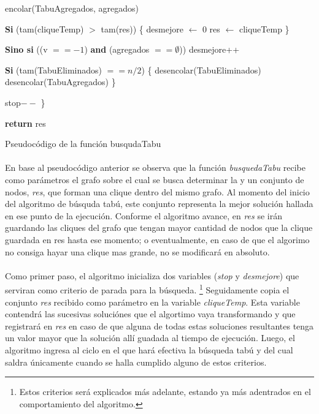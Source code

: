 \begin{algorithm}[H]
	\BlankLine \BlankLine		
	\tab encolar(TabuAgregados, agregados)												
	
	\BlankLine \BlankLine
	\tab \textbf{Si} (tam(cliqueTemp) $>$ tam(res)) \{ 									
	\tab \tab desmejore $\leftarrow$ 0													
	\tab \tab res $\leftarrow$ cliqueTemp												
	\tab \}

	\BlankLine \BlankLine		
	\tab \textbf{Sino si} ((v $== -1$) \textbf{and} (agregados $== \emptyset$)) 	
	\tab \tab desmejore++																
	
	\BlankLine \BlankLine
	\tab \textbf{Si} (tam(TabuEliminados) $== n/2$) \{									
	\tab \tab desencolar(TabuEliminados)												
	\tab \tab desencolar(TabuAgregados)												
	\tab \}	

	\BlankLine \BlankLine
	\tab stop$--$ 																			
	\}
	
	\BlankLine \BlankLine		
	\textbf{return} res																	
\caption{Pseudocódigo de la función busqudaTabu} 
\normalsize
\end{algorithm}

\paragraph{}
En base al pseudocódigo anterior se observa que la función \textit{busquedaTabu} recibe como parámetros el grafo sobre el cual se busca determinar la \mc y un conjunto de nodos, \textit{res}, que forman una clique dentro del mismo grafo. Al momento del inicio del algoritmo de búsquda tabú, este conjunto representa la mejor solución hallada en ese punto de la ejecución. Conforme el algoritmo avance, en \textit{res} se irán guardando las cliques del grafo que tengan mayor cantidad de nodos que la clique guardada en res hasta ese momento; o eventualmente, en caso de que el algorimo no consiga hayar una clique mas grande, no se modificará en absoluto.

\paragraph{}
Como primer paso, el algoritmo inicializa dos variables (\textit{stop} y \textit{desmejore}) que serviran como criterio de parada para la búsqueda. \footnote{Estos criterios será explicados más adelante, estando ya más adentrados en el comportamiento del algoritmo.} Seguidamente copia el conjunto \textit{res} recibido como parámetro en la variable \textit{cliqueTemp}. Esta variable contendrá las sucesivas soluciónes que el algortimo vaya transformando y que registrará en \textit{res} en caso de que alguna de todas estas soluciones resultantes tenga un valor mayor que la solución allí guadada al tiempo de ejecución. Luego, el algoritmo ingresa al ciclo en el que hará efectiva la búsqueda tabú y del cual saldra únicamente cuando se halla cumplido alguno de estos criterios.  

